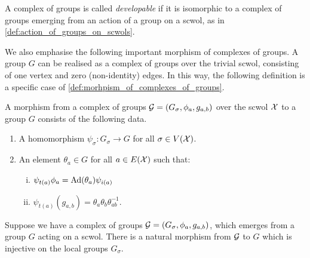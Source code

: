 \begin{definition}
	A complex of groups is called \emph{developable} if it is isomorphic to a complex of groups emerging from an action of a group on a scwol, as in \cref{def:action_of_groups_on_scwols}.
\end{definition}

We also emphasise the following important morphism of complexes of groups.
A group $G$ can be realised as a complex of groups over the trivial scwol, consisting of one vertex and zero (non-identity) edges.
In this way, the following definition is a specific case of \cref{def:morhpism_of_complexes_of_groups}.

\begin{definition}
	A morphism from a complex of groups $\mathcal{G} = (G_\sigma, \phi_a, g_{a,b})$ over the scwol $\mathcal{X}$ to a group $G$ consists of the following data.
	\begin{enumerate}
		\item A homomorphism $\psi_\sigma \colon G_\sigma \to G$ for all $\sigma \in V(\mathcal{X})$.
		\item An element $\theta_a \in G$ for all $a \in E(\mathcal{X})$ such that:
		      \begin{enumerate}[(i)]
			      \item $\psi_{t(a)}\phi_a = \operatorname{Ad}(\theta_a)\psi_{i(a)}$
			      \item $\psi_{t(a)}(g_{a,b}) = \theta_a\theta_b\theta_{ab}^{-1}$.
		      \end{enumerate}
	\end{enumerate}
	\label{def:morphism_of_complex_of_groups_to_group}
\end{definition}
Suppose we have a complex of groups $\mathcal{G} = (G_\sigma, \phi_a, g_{a,b})$, which emerges from a group  $G$ acting on a scwol.
There is a natural morphism from $\mathcal{G}$ to $G$ which is injective on the local groups  $G_\sigma$.

